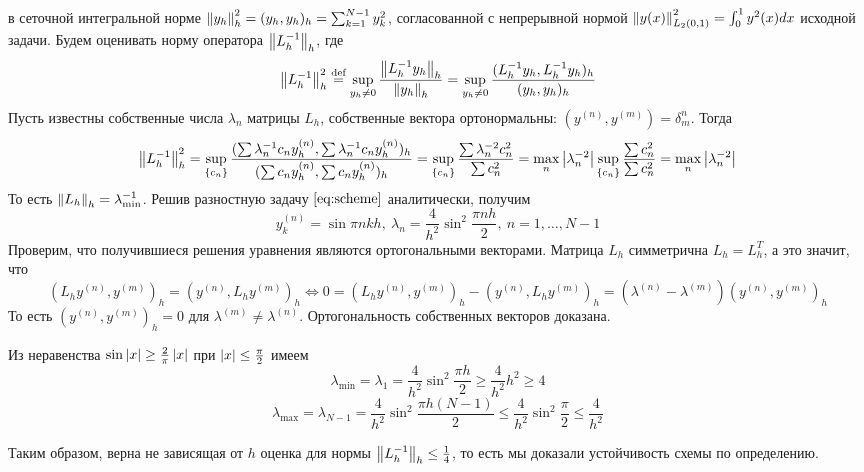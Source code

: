 в сеточной интегральной норме $\left\lVert y_h\right\rVert^2_h=(y_h,y_h)_h=\sum_{k=1}^{N-1}y_k^2$, согласованной с непрерывной нормой $\left\lVert y(x)\right\rVert_{L_2(0,1)}^2=\int_{0}^{1}y^2(x)dx$ исходной задачи.
Будем оценивать норму оператора $\left\lVert L_h^{-1}\right\rVert_h$, где
\[\left\lVert L_h^{-1}\right\rVert_h^2\stackrel{\text{def}}{=}\sup_{y_h\neq0}\frac{\left\lVert L_h^{-1}y_h\right\rVert_h}{\left\lVert y_h\right\rVert_h}=\sup_{y_h\neq0}\frac{(L_h^{-1}y_h,L_h^{-1}y_h)_h}{(y_h,y_h)_h}\]
Пусть известны собственные числа $\lambda_n$ матрицы $L_h$,
собственные вектора ортонормальны: $(y^{(n)},y^{(m)})=\delta_m^n$.
Тогда
\[\left\lVert L_h^{-1}\right\rVert_h^2=\sup_{\{c_n\}}\frac{(\sum\lambda^{-1}_nc_ny_h^{(n)},\sum\lambda^{-1}_nc_ny_h^{(n)})_h}{(\sum c_ny_h^{(n)},\sum c_ny_h^{(n)})_h}=\sup_{\{c_n\}}\frac{\sum\lambda^{-2}_nc^2_n}{\sum c_n^2}=\max_n{\left\lvert\lambda_n^{-2}\right\rvert}\sup_{\{c_n\}}\frac{\sum c^2_n}{\sum c_n^2}=\max_n{\left\lvert\lambda_n^{-2}\right\rvert}\]
То есть $\left\lVert L_h\right\rVert_h=\lambda^{-1}_{\min}$. Решив разностную задачу $\eqref{eq:scheme}$ аналитически, получим
\[y_k^{(n)}=\sin\pi nkh,\ \lambda_n=\frac{4}{h^2}\sin^2\frac{\pi nh}{2},\ n=1,\ldots,N-1\]
Проверим, что получившиеся решения уравнения являются ортогональными векторами.
Матрица $L_h$ симметрична $L_h=L_h^T$, а это значит, что
\[(L_hy^{(n)},y^{(m)})_h=(y^{(n)},L_hy^{(m)})_h\Leftrightarrow 0=(L_hy^{(n)},y^{(m)})_h-(y^{(n)},L_hy^{(m)})_h=(\lambda^{(n)}-\lambda^{(m)})(y^{(n)},y^{(m)})_h\]
То есть $(y^{(n)},y^{(m)})_h=0$ для $\lambda^{(m)}\neq\lambda^{(n)}$.
Ортогональность собственных векторов доказана.

\begin{minipage}{.5\linewidth}
\end{minipage}\hfill
\begin{minipage}{.5\linewidth}
  Из неравенства $\sin\left\lvert x\right\rvert\geq\frac{2}{\pi}\left\lvert x\right\rvert$ при $\left\lvert x\right\rvert\leq\frac{\pi}{2}$ имеем
  \[\lambda_{\min}=\lambda_1=\frac{4}{h^2}\sin^2\frac{\pi h}{2}\geq\frac{4}{h^2}h^2\geq4\]
  \[\lambda_{\max}=\lambda_{N-1}=\frac{4}{h^2}\sin^2\frac{\pi h(N-1)}{2}\leq\frac{4}{h^2}\sin^2\frac{\pi}{2}\leq\frac{4}{h^2}\]
\end{minipage}
Таким образом, верна не зависящая от $h$ оценка для нормы $\left\lVert L_h^{-1}\right\rVert_h\leq\frac{1}{4}$,
то есть мы доказали устойчивость схемы по определению.
